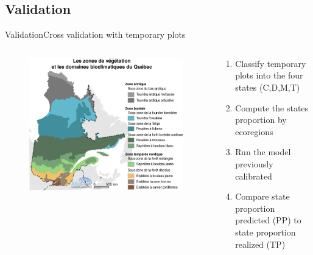 \documentclass[table]{eecslides}
\begin{document}
\subsection{Validation}

\begin{frame}{Validation}{Cross validation with temporary plots}

\begin{columns}[c]
	\begin{column}[c]{.40\paperwidth}
		\begin{figure}
			\includegraphics[width=.40\paperwidth]{Figs/zone_vege_qc.pdf}
		\end{figure}
	\end{column}
	\begin{column}[l]{.40\paperwidth}
		\begin{enumerate}
			\item Classify temporary plots into the four states (C,D,M,T)
			\item Compute the states proportion by ecoregions
			\item Run the model previously calibrated
			\item Compare state proportion predicted (PP) to state proportion realized (TP)
		\end{enumerate}
	\end{column}
\end{columns}

\end{frame}
\end{document}
